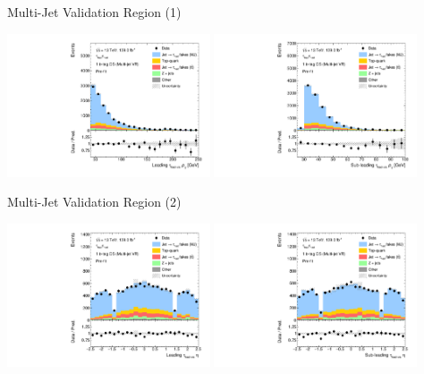\documentclass[11pt, xcolor={dvipsnames}, aspectratio=169]{beamer}
\begin{document}
\begin{frame}{Multi-Jet Validation Region (1)}
  \centering

  \includegraphics[width=0.45\textwidth]{fakefactors/fake_os_vr/Tau0Pt_fakevr}%
  \hfill%
  \includegraphics[width=0.45\textwidth]{fakefactors/fake_os_vr/Tau1Pt_fakevr}
\end{frame}


\begin{frame}{Multi-Jet Validation Region (2)}
  \centering

  \includegraphics[width=0.45\textwidth]{fakefactors/fake_os_vr/Tau0Eta_fakevr}%
  \hfill%
  \includegraphics[width=0.45\textwidth]{fakefactors/fake_os_vr/Tau1Eta_fakevr}
\end{frame}
\end{document}
